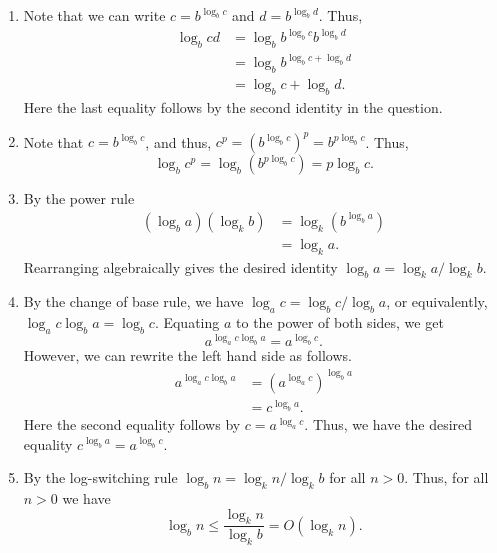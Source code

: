 \documentclass[12 pt, letterpaper]{hmcpset}
\begin{document}
\begin{solution}
	\begin{enumerate}
		\item Note that we can write $c = b^{\log_{b} c}$ and $d = b^{\log_{b} d}$. Thus,
			\begin{align*}
				\log_{b} cd & = \log_{b} b^{\log_{b} c} b^{\log_{b} d} \\
					    & = \log_{b} b^{\log_{b} c + \log_{b} d} \\
					    & = \log_{b} c + \log_{b} d.
			\end{align*}
			Here the last equality follows by the second identity in the question.

		\item Note that $c = b^{\log_{b} c}$, and thus, $c^{p} = (b^{\log_{b} c})^{p} = b^{p \log_{b} c}$. Thus,
			\[
				\log_{b} c^{p} = \log_{b} (b^{p \log_{b} c}) = p  \log_{b} c.
			\]

		\item By the power rule
			\begin{align*}
				(\log_{b} a) (\log_{k} b) & = \log_{k} (b^{\log_{b} a}) \\
							  & = \log_{k} a.
			\end{align*}
			Rearranging algebraically gives the desired identity $\log_{b} a = \log_{k} a / \log_{k} b$.

		\item By the change of base rule, we have $\log_{a} c = \log_{b} c / \log_{b} a$, or equivalently, $\log_{a} c \log_{b} a = \log_{b} c$. Equating $a$ to the power of both sides, we get
			\[
				a^{\log_{a} c \log_{b} a} = a^{\log_{b} c}.
			\]
			However, we can rewrite the left hand side as follows.
			\begin{align*}
				a^{\log_{a} c \log_{b} a} & = (a^{\log_{a} c})^{\log_{b} a} \\
							  & = c^{\log_{b} a}.
			\end{align*}
			Here the second equality follows by $c = a^{\log_{a} c}$. Thus, we have the desired equality $c^{\log_{b} a} = a^{\log_{b} c}$.

		\item By the log-switching rule $\log_{b} n = \log_{k} n / \log_{k} b$ for all $n > 0$. Thus, for all $n > 0$ we have
			\[
				\log_{b} n \le \frac{\log_{k} n}{\log_{k} b} = O(\log_{k} n).
			\]
	\end{enumerate}
\end{solution}

\pagebreak
\end{document}
